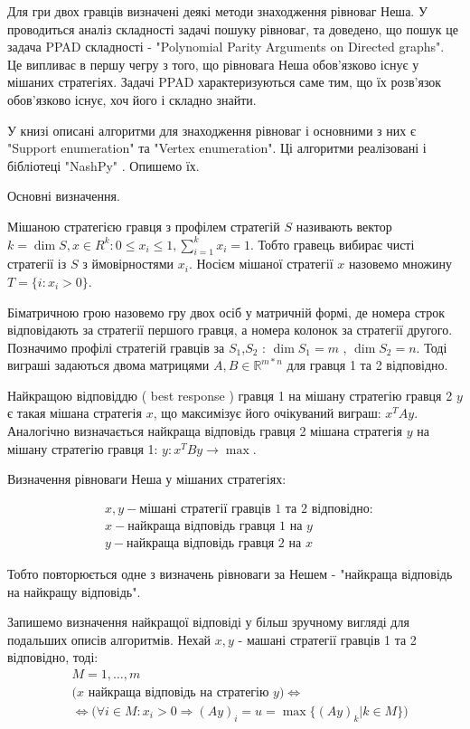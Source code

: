 Для гри двох гравців визначені деякі методи знаходження рівноваг Неша. У \cite{NashComplexity} проводиться аналіз складності задачі пошуку рівноваг, та доведено, що пошук це задача PPAD складності - "Polynomial Parity Arguments on Directed graphs". Це випливає в першу чегру з того, що рівновага Неша обов'язково існує у мішаних стратегіях. Задачі PPAD характеризуються саме тим, що їх розв'язок обов'язково існує, хоч його і складно знайти.

У книзі \cite{AlgoGameTheory} описані алгоритми для знаходження рівноваг і основними з них є "Support enumeration" та "Vertex enumeration". Ці алгоритми реалізовані і бібліотеці "NashPy" \cite{NashPy}. Опишемо їх.

Основні визначення.

Мішаною стратегією гравця з профілем стратегій $S$ називають вектор $k = \dim S, x \in R^{k} : 0 \le x_i \le 1, \sum_{i=1}^{k} x_i = 1$. Тобто гравець вибирає чисті стратегії із $S$ з ймовірностями $x_i$. Носієм мішаної стратегії $x$ назовемо множину $T=\{ i: x_i > 0\}$.

Біматричною грою назовемо гру двох осіб у матричній формі, де номера строк відповідають за стратегії першого гравця, а номера колонок за стратегії другого. Позначимо профілі стратегій гравців за $S_1$,$S_2$ : $\dim {S_1} = m$ , $\dim {S_2} = n$. Тоді виграші задаються двома матрицями $A,B \in \mathbb{R}^{m*n}$ для гравця 1 та 2 відповідно.

Найкращою відповіддю ( best response ) гравця 1 на мішану стратегію гравця 2 $y$ є такая мішана стратегія $x$, що максимізує його очікуваний виграш: $x^TAy$. Аналогічно визначається найкраща відповідь гравця 2 мішана стратегія $y$ на мішану стратегію гравця 1: $y: x^TBy \rightarrow \max$.

Визначення рівноваги Неша у мішаних стратегіях:

\begin{equation}
	\begin{aligned}
		& x,y - \textrm{мішані стратегії гравців 1 та 2 відповідно}: \\
		& x - \textrm{найкраща відповідь гравця 1 на } y \\
		& y - \textrm{найкраща відповідь гравця 2 на } x
	\end{aligned}
\end{equation}

Тобто повторюється одне з визначень рівноваги за Нешем - "найкраща відповідь на найкращу відповідь".

Запишемо визначення найкращої відповіді у більш зручному вигляді для подальших описів алгоритмів. Нехай $x,y$ - машані стратегії гравців 1 та 2 відповідно, тоді:
\begin{equation}
	\begin{aligned}
		& M = {1,\ldots,m} \\
		& \bigg( x \textrm{ найкраща відповідь на стратегію } y  \bigg)\Leftrightarrow \\
		& \Leftrightarrow \bigg( \forall i \in M: x_i > 0 \Rightarrow (Ay)_i = u = \max\{(Ay)_k | k \in M\} \bigg)
	\end{aligned}
	\label{eq:best_response}
\end{equation}

